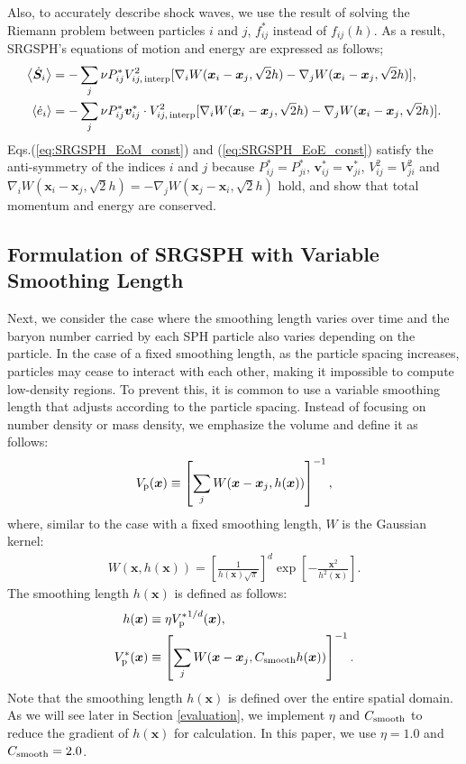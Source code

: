 \documentclass[]{aastex631}
\begin{document}
Also, to accurately describe shock waves, we use 
the result of solving the Riemann problem between particles $i$ and $j$, 
$f^*_{ij}$ instead of $f_{ij}(h)$.
As a result, SRGSPH's equations of motion and energy are expressed as follows;
\begin{align}
\label{eq:SRGSPH_EoM_const}
    \ev{\dot{\bm{S}}_i} &= -\sum_j \nu P^*_{ij}V^2_{ij,\, {\rm interp}}[\nabla_iW(\bm{x}_i-\bm{x}_j,\sqrt{2}h) - \nabla_jW(\bm{x}_i-\bm{x}_j,\sqrt{2}h)], \\
\label{eq:SRGSPH_EoE_const}
    \ev{\dot{e}_i} &= -\sum_j \nu P^*_{ij}\bm{v}^*_{ij}\cdot V^2_{ij,\, {\rm interp}}[\nabla_iW(\bm{x}_i-\bm{x}_j,\sqrt{2}h) - \nabla_jW(\bm{x}_i-\bm{x}_j,\sqrt{2}h)].
\end{align}
Eqs.(\ref{eq:SRGSPH_EoM_const}) and (\ref{eq:SRGSPH_EoE_const}) satisfy the anti-symmetry of the indices $i$ and $j$ because $P^*_{ij}=P^*_{ji}$, $\bm{v}^*_{ij}=\bm{v}^*_{ji}$, $V^2_{ij}=V^2_{ji}$ and $\nabla_iW(\bm{x}_i-\bm{x}_j,\sqrt{2}h)=-\nabla_jW(\bm{x}_j-\bm{x}_i,\sqrt{2}h)$ hold, and show that total momentum and energy are conserved.

\subsection{Formulation of SRGSPH with Variable Smoothing Length}
Next, we consider the case where the smoothing length varies over time and the baryon number carried by each SPH particle also varies depending on the particle.
In the case of a fixed smoothing length, as the particle spacing increases, particles may cease to interact with each other, making it impossible to compute low-density regions. To prevent this, it is common to use a variable smoothing length that adjusts according to the particle spacing.
Instead of focusing on number density or mass density, we emphasize the volume and define it as follows:
\begin{align}
    \label{eq:def_Vp}
    V_{\rm p}(\bm{x})\equiv\left[ \sum_j W(\bm{x}-\bm{x}_j,h(\bm{x}))\right]^{-1},
\end{align}
where, similar to the case with a fixed smoothing length, $W$ is the Gaussian kernel:
\begin{align}
    W(\bm{x},h(\bm{x})) = \left[ \frac{1}{h(\bm{x}) \sqrt{\pi}} \right]^d\exp \left[ -\frac{\bm{x}^2}{h^2(\bm{x})} \right].
\end{align}
The smoothing length $h(\bm{x})$ is defined as follows:
\begin{align}
    \label{eq:def_h}
    h(\bm{x}) &\equiv  \eta {V_{\rm p}^*}^{1/d}(\bm{x}),\\
    \label{eq:def_Vp*}
    V_{\rm p}^*(\bm{x}) &\equiv \left[ \sum_j W(\bm{x}-\bm{x}_j,C_{\rm smooth}h(\bm{x}))\right]^{-1}.
\end{align}
Note that the smoothing length $h(\bm{x})$ is defined over the entire spatial domain.
As we will see later in Section \ref{evaluation}, we implement $\eta$ and $C_{\rm smooth}$ to reduce the gradient of $h(\bm{x})$ for calculation. In this paper, we use $\eta=1.0$ and $C_{\rm smooth}=2.0$.
\end{document}

